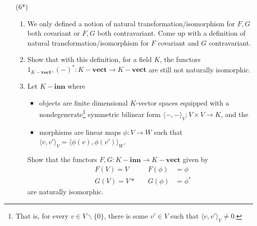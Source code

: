 \documentclass{amsart}[12pt]
\numberwithin{equation}{section}
\theoremstyle{plain} %
\theoremstyle{definition}
\theoremstyle{remark}
\newcommand{\vs}[1]{#1-\mathbf{vect}}
\begin{document}
\begin{enumerate}
\item[(6*)]
\begin{enumerate}
\item We only defined a notion of natural transformation/isomorphism for $F,G$ both covariant or $F,G$ both contravariant. Come up with a definition of natural transformation/isomorphism for $F$ covariant and $G$ contravariant.
\item Show that with this definition, for a field $K$, the functors $1_{\vs{K}},(-)^*:\vs{K}\to \vs{K}$ are still not naturally isomorphic.
\item Let $K-\mathbf{inn}$ where 
\begin{itemize}
\item objects are finite dimensional $K$-vector spaces equipped with a nondegenerate\footnote{That is, for every $v\in V\smallsetminus\{0\}$, there is some $v'\in V$ such that $\langle v, v' \rangle_V\neq 0$.} symmetric bilinear form $\langle - , - \rangle_V: V\times V \to K$, and the 
\item morphisms are linear maps $\phi:V\to W$ such that $\langle v, v' \rangle_V = \langle \phi(v) , \phi(v')\rangle_W$.
\end{itemize}
 Show that the functors $F,G:K-\mathbf{inn}\to \vs{K}$ given by
\[\begin{aligned} &F(V)= V  \quad	&F(\phi)&=\phi \\
&G(V) = V* 	\quad	 &G(\phi)&= \phi^*\end{aligned}\]
 are naturally isomorphic.
\end{enumerate}
\end{enumerate}
\end{document}
